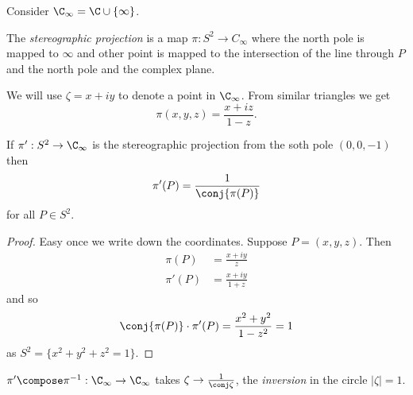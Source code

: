 \documentclass[a4paper]{article}
\begin{document}
Consider \(\C_\infty = \C \cup \{\infty\}\).

\begin{definition}
  The \emph{stereographic projection} is a map \(\pi: S^2 \to C_\infty\) where the north pole is mapped to \(\infty\) and other point is mapped to the intersection of the line through \(P\) and the north pole and the complex plane.
\end{definition}

We will use \(\zeta = x + iy\) to denote a point in \(\C_\infty\). From similar triangles we get
\[
  \pi(x, y, z) = \frac{x + iz}{1 - z}.
\]

\begin{lemma}
  If \(\pi': S^2 \to \C_\infty\) is the stereographic projection from the soth pole \((0, 0, -1)\) then
  \[
    \pi'(P) = \frac{1}{\conj{\pi(P)}}
  \]
  for all \(P \in S^2\).
\end{lemma}

\begin{proof}
  Easy once we write down the coordinates. Suppose \(P = (x, y, z)\). Then
  \begin{align*}
    \pi(P) &= \frac{x + iy}{z} \\
    \pi'(P) &= \frac{x + iy}{1 + z}
  \end{align*}
  and so
  \[
    \conj{\pi(P)} \cdot \pi'(P) = \frac{x^2 + y^2}{1 - z^2} = 1
  \]
  as \(S^2 = \{x^2 + y^2 + z^2 = 1\}\).
\end{proof}

\begin{note}
  \(\pi' \compose \pi^{-1}: \C_\infty \to \C_\infty\) takes \(\zeta \to \frac{1}{\conj \zeta}\), the \emph{inversion} in the circle \(|\zeta| = 1\).
\end{note}






\printindex

\iffalse
Other courses that might be useful: topology, part of analysis II (differentiability in R^n and inverse function theorem)

Leads to: IID Differential Geometry

Reading List

P.\ Wilson, Curverd Spaces, CUP 2008
From classical geometries to elementary differential geometry
\fi
\end{document}
